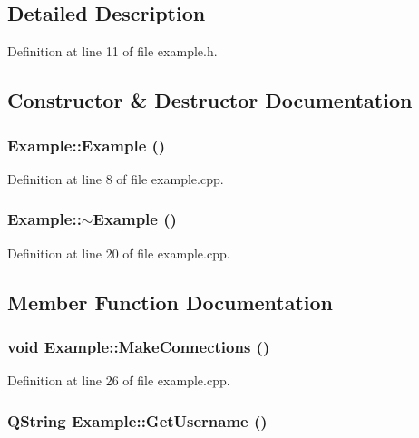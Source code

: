 \subsection{Detailed Description}


Definition at line 11 of file example.h.

\subsection{Constructor \& Destructor Documentation}
\hypertarget{classExample_5c049b2b4bf7064103834620ae7cad7f}{
\subsubsection{\setlength{\rightskip}{0pt plus 5cm}Example::Example ()}}
\label{classExample_5c049b2b4bf7064103834620ae7cad7f}




Definition at line 8 of file example.cpp.\hypertarget{classExample_fd58269241a2443d78fcc128ab23cc92}{
\subsubsection{\setlength{\rightskip}{0pt plus 5cm}Example::$\sim$Example ()}}
\label{classExample_fd58269241a2443d78fcc128ab23cc92}




Definition at line 20 of file example.cpp.

\subsection{Member Function Documentation}
\hypertarget{classExample_b873af1dbeb0620c1a243f14df215fa8}{
\subsubsection{\setlength{\rightskip}{0pt plus 5cm}void Example::MakeConnections ()}}
\label{classExample_b873af1dbeb0620c1a243f14df215fa8}




Definition at line 26 of file example.cpp.\hypertarget{classExample_f5cb37421c35d6c2d84abb02fcc37c9f}{
\subsubsection{\setlength{\rightskip}{0pt plus 5cm}QString Example::GetUsername ()}}
\label{classExample_f5cb37421c35d6c2d84abb02fcc37c9f}




